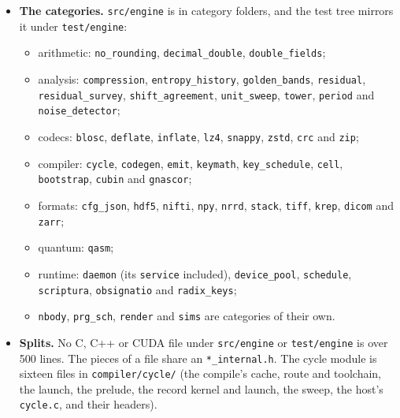 \begin{enumerate}
\begin{itemize}
\item \textbf{The categories.} \texttt{src/\allowbreak{}engine} is in category folders, and the test tree mirrors it under \texttt{test/\allowbreak{}engine}:

\begin{itemize}
\item arithmetic: \texttt{no\_\allowbreak{}rounding}, \texttt{decimal\_\allowbreak{}double}, \texttt{double\_\allowbreak{}fields};
\item analysis: \texttt{compression}, \texttt{entropy\_\allowbreak{}history}, \texttt{golden\_\allowbreak{}bands}, \texttt{residual}, \texttt{residual\_\allowbreak{}survey}, \texttt{shift\_\allowbreak{}agreement}, \texttt{unit\_\allowbreak{}sweep}, \texttt{tower}, \texttt{period} and \texttt{noise\_\allowbreak{}detector};
\item codecs: \texttt{blosc}, \texttt{deflate}, \texttt{inflate}, \texttt{lz4}, \texttt{snappy}, \texttt{zstd}, \texttt{crc} and \texttt{zip};
\item compiler: \texttt{cycle}, \texttt{codegen}, \texttt{emit}, \texttt{keymath}, \texttt{key\_\allowbreak{}schedule}, \texttt{cell}, \texttt{bootstrap}, \texttt{cubin} and \texttt{gnascor};
\item formats: \texttt{cfg\_\allowbreak{}json}, \texttt{hdf5}, \texttt{nifti}, \texttt{npy}, \texttt{nrrd}, \texttt{stack}, \texttt{tiff}, \texttt{krep}, \texttt{dicom} and \texttt{zarr};
\item quantum: \texttt{qasm};
\item runtime: \texttt{daemon} (its \texttt{service} included), \texttt{device\_\allowbreak{}pool}, \texttt{schedule}, \texttt{scriptura}, \texttt{obsignatio} and \texttt{radix\_\allowbreak{}keys};
\item \texttt{nbody}, \texttt{prg\_\allowbreak{}sch}, \texttt{render} and \texttt{sims} are categories of their own.
\end{itemize}
\item \textbf{Splits.} No C, C++ or CUDA file under \texttt{src/\allowbreak{}engine} or \texttt{test/\allowbreak{}engine} is over 500 lines. The pieces of a file share an \texttt{*\_\allowbreak{}internal.\allowbreak{}h}. The cycle module is sixteen files in \texttt{compiler/\allowbreak{}cycle/\allowbreak{}} (the compile's cache, route and toolchain, the launch, the prelude, the record kernel and launch, the sweep, the host's \texttt{cycle.\allowbreak{}c}, and their headers).

\end{itemize}
\end{enumerate}
